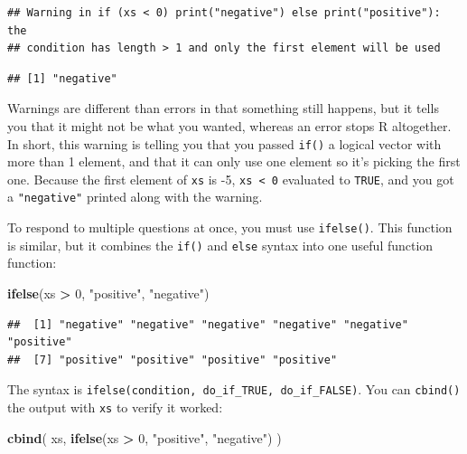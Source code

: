 \documentclass[]{book}
\newenvironment{Shaded}{\begin{snugshade}}{\end{snugshade}}
\newcommand{\KeywordTok}[1]{\textcolor[rgb]{0.13,0.29,0.53}{\textbf{#1}}}
\newcommand{\DecValTok}[1]{\textcolor[rgb]{0.00,0.00,0.81}{#1}}
\newcommand{\StringTok}[1]{\textcolor[rgb]{0.31,0.60,0.02}{#1}}
\newcommand{\OperatorTok}[1]{\textcolor[rgb]{0.81,0.36,0.00}{\textbf{#1}}}
\newcommand{\NormalTok}[1]{#1}
\theoremstyle{definition}
\theoremstyle{definition}
\theoremstyle{definition}
\theoremstyle{remark}
\begin{document}
\begin{verbatim}
## Warning in if (xs < 0) print("negative") else print("positive"): the
## condition has length > 1 and only the first element will be used
\end{verbatim}

\begin{verbatim}
## [1] "negative"
\end{verbatim}

Warnings are different than errors in that something still happens, but
it tells you that it might not be what you wanted, whereas an error
stops R altogether. In short, this warning is telling you that you
passed \texttt{if()} a logical vector with more than 1 element, and that
it can only use one element so it's picking the first one. Because the
first element of \texttt{xs} is -5, \texttt{xs\ \textless{}\ 0}
evaluated to \texttt{TRUE}, and you got a \texttt{"negative"} printed
along with the warning.

To respond to multiple questions at once, you must use
\texttt{ifelse()}. This function is similar, but it combines the
\texttt{if()} and \texttt{else} syntax into one useful function
function:

\begin{Shaded}
\begin{Highlighting}[]
\KeywordTok{ifelse}\NormalTok{(xs }\OperatorTok{>}\StringTok{ }\DecValTok{0}\NormalTok{, }\StringTok{"positive"}\NormalTok{, }\StringTok{"negative"}\NormalTok{)}
\end{Highlighting}
\end{Shaded}

\begin{verbatim}
##  [1] "negative" "negative" "negative" "negative" "negative" "positive"
##  [7] "positive" "positive" "positive" "positive"
\end{verbatim}

The syntax is \texttt{ifelse(condition,\ do\_if\_TRUE,\ do\_if\_FALSE)}.
You can \texttt{cbind()} the output with \texttt{xs} to verify it
worked:

\begin{Shaded}
\begin{Highlighting}[]
\KeywordTok{cbind}\NormalTok{(}
\NormalTok{  xs,}
  \KeywordTok{ifelse}\NormalTok{(xs }\OperatorTok{>}\StringTok{ }\DecValTok{0}\NormalTok{, }\StringTok{"positive"}\NormalTok{, }\StringTok{"negative"}\NormalTok{)}
\NormalTok{)}
\end{Highlighting}
\end{Shaded}
\end{document}
